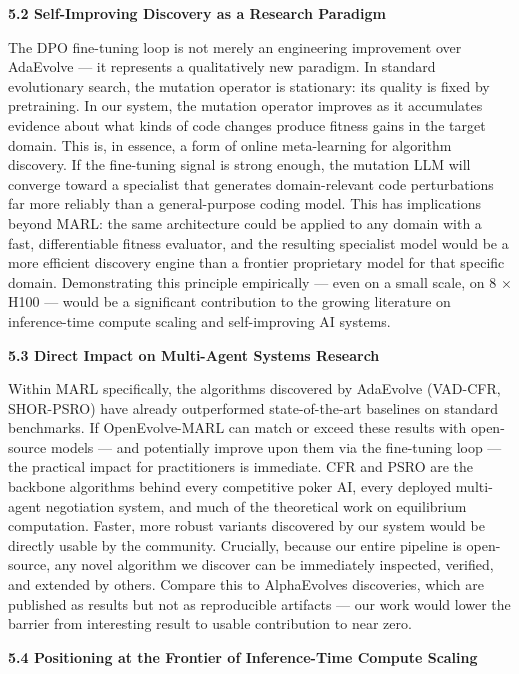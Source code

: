 \textbf{5.2 Self-Improving Discovery as a Research Paradigm}

The DPO fine-tuning loop is not merely an engineering improvement over
AdaEvolve --- it represents a qualitatively new paradigm. In standard
evolutionary search, the mutation operator is stationary: its quality is
fixed by pretraining. In our system, the mutation operator improves as
it accumulates evidence about what kinds of code changes produce fitness
gains in the target domain. This is, in essence, a form of online
meta-learning for algorithm discovery. If the fine-tuning signal is
strong enough, the mutation LLM will converge toward a specialist that
generates domain-relevant code perturbations far more reliably than a
general-purpose coding model. This has implications beyond MARL: the
same architecture could be applied to any domain with a fast,
differentiable fitness evaluator, and the resulting specialist model
would be a more efficient discovery engine than a frontier proprietary
model for that specific domain. Demonstrating this principle empirically
--- even on a small scale, on 8 × H100 --- would be a significant
contribution to the growing literature on inference-time compute scaling
and self-improving AI systems.

\textbf{5.3 Direct Impact on Multi-Agent Systems Research}

Within MARL specifically, the algorithms discovered by AdaEvolve
(VAD-CFR, SHOR-PSRO) have already outperformed state-of-the-art
baselines on standard benchmarks. If OpenEvolve-MARL can match or exceed
these results with open-source models --- and potentially improve upon
them via the fine-tuning loop --- the practical impact for practitioners
is immediate. CFR and PSRO are the backbone algorithms behind every
competitive poker AI, every deployed multi-agent negotiation system, and
much of the theoretical work on equilibrium computation. Faster, more
robust variants discovered by our system would be directly usable by the
community. Crucially, because our entire pipeline is open-source, any
novel algorithm we discover can be immediately inspected, verified, and
extended by others. Compare this to AlphaEvolve\textquotesingle s
discoveries, which are published as results but not as reproducible
artifacts --- our work would lower the barrier from
\textquotesingle interesting result\textquotesingle{} to
\textquotesingle usable contribution\textquotesingle{} to near zero.

\textbf{5.4 Positioning at the Frontier of Inference-Time Compute
Scaling}

